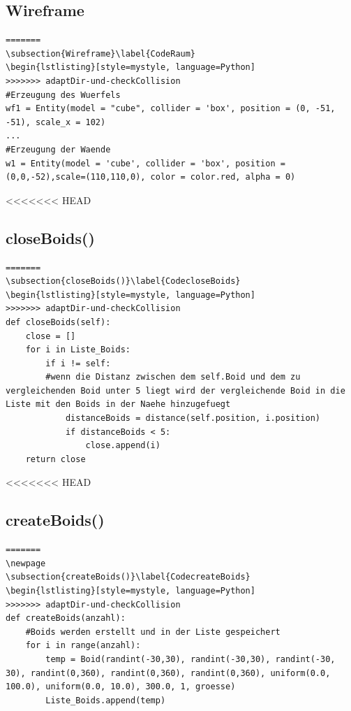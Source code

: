 \documentclass[a4paper, hidelinks, 12pt]{article}
\begin{document}
\subsection{Wireframe}
\begin{lstlisting}[style=mystyle]
=======
\subsection{Wireframe}\label{CodeRaum}
\begin{lstlisting}[style=mystyle, language=Python]
>>>>>>> adaptDir-und-checkCollision
#Erzeugung des Wuerfels
wf1 = Entity(model = "cube", collider = 'box', position = (0, -51, -51), scale_x = 102)
...
#Erzeugung der Waende
w1 = Entity(model = 'cube', collider = 'box', position = (0,0,-52),scale=(110,110,0), color = color.red, alpha = 0)
\end{lstlisting}
<<<<<<< HEAD
\subsection{closeBoids()}
\begin{lstlisting}[style=mystyle]
=======
\subsection{closeBoids()}\label{CodecloseBoids}
\begin{lstlisting}[style=mystyle, language=Python]
>>>>>>> adaptDir-und-checkCollision
def closeBoids(self):
    close = []
    for i in Liste_Boids:
    	if i != self:
    	#wenn die Distanz zwischen dem self.Boid und dem zu vergleichenden Boid unter 5 liegt wird der vergleichende Boid in die Liste mit den Boids in der Naehe hinzugefuegt
		    distanceBoids = distance(self.position, i.position)
    		if distanceBoids < 5:
    			close.append(i)
    return close
\end{lstlisting}
<<<<<<< HEAD
\subsection{createBoids()}
\begin{lstlisting}[style=mystyle]
=======
\newpage
\subsection{createBoids()}\label{CodecreateBoids}
\begin{lstlisting}[style=mystyle, language=Python]
>>>>>>> adaptDir-und-checkCollision
def createBoids(anzahl):
	#Boids werden erstellt und in der Liste gespeichert
	for i in range(anzahl):
		temp = Boid(randint(-30,30), randint(-30,30), randint(-30, 30), randint(0,360), randint(0,360), randint(0,360), uniform(0.0, 100.0), uniform(0.0, 10.0), 300.0, 1, groesse)
		Liste_Boids.append(temp)
\end{lstlisting}
\end{document}
